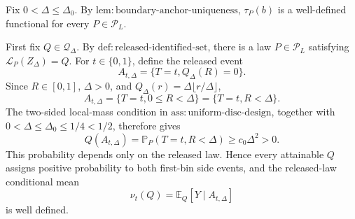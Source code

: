 Fix \(0<\Delta\leq\Delta_0\).  By \(\mathrm{lem:boundary\text{-}anchor\text{-}uniqueness}\), \(\tau_P(b)\) is a well-defined functional for every \(P\in\mathcal P_L\).

First fix \(Q\in\mathcal Q_\Delta\).  By \(\mathrm{def:released\text{-}identified\text{-}set}\), there is a law \(P\in\mathcal P_L\) satisfying \(\mathcal L_P(Z_\Delta)=Q\).  For \(t\in\{0,1\}\), define the released event
\[
 A_{t,\Delta}=\{T=t,Q_\Delta(R)=0\}.
\]
Since \(R\in[0,1]\), \(\Delta>0\), and \(Q_\Delta(r)=\Delta\lfloor r/\Delta\rfloor\),
\[
 A_{t,\Delta}=\{T=t,0\leq R<\Delta\}=\{T=t,R<\Delta\}.
\]
The two-sided local-mass condition in \(\mathrm{ass:uniform\text{-}disc\text{-}design}\), together with \(0<\Delta\leq\Delta_0\leq1/4<1/2\), therefore gives
\[
 Q(A_{t,\Delta})
 =\mathbb P_P(T=t,R<\Delta)
 \geq c_0\Delta^2>0.
\]
This probability depends only on the released law.  Hence every attainable \(Q\) assigns positive probability to both first-bin side events, and the released-law conditional mean
\[
 \nu_t(Q)=\mathbb E_Q[Y\mid A_{t,\Delta}]
\]
is well defined.

